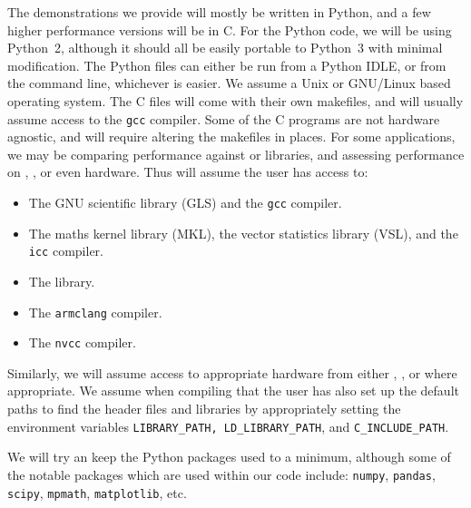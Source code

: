 \documentclass[11pt,a4paper,twoside,english]{extarticle}
\begin{document}
The demonstrations we provide will mostly be written in Python, and a few higher performance versions will be in C. For the Python code, we will be using Python~2, although it should all be easily portable to Python~3 with minimal modification. The Python files can either be run from a Python IDLE, or from the command line, whichever is easier. We assume a Unix or GNU/Linux based operating system. The C files will come with their own makefiles, and will usually assume access to the \texttt{gcc} compiler. Some of the C programs are not hardware agnostic, and will require altering the makefiles in places. For some applications, we may be comparing performance against \intel or \nag libraries, and assessing performance on \intel, \arm, or even \nvidia hardware. Thus will assume the user has access to:
\begin{itemize}
\item The GNU scientific library (GLS) and the \texttt{gcc} compiler.
\item The \intel maths kernel library (MKL), the vector statistics library (VSL), and the \texttt{icc} compiler. 
\item The \nag library. 
\item The \arm \texttt{armclang} compiler.
\item The \nvidia \texttt{nvcc} compiler.
\end{itemize} 
Similarly, we will assume access to appropriate hardware from either \intel, \arm, or \nvidia where appropriate. We assume when compiling that the user has also set up the default paths to find the header files and libraries by appropriately setting the environment variables \verb|LIBRARY_PATH, |\verb|LD_LIBRARY_PATH|, and \verb|C_INCLUDE_PATH|.

We will try an keep the Python packages used to a minimum, although some of the notable packages which are used within our code include: \texttt{numpy}, \texttt{pandas}, \texttt{scipy}, \texttt{mpmath}, \texttt{matplotlib}, etc. 
\end{document}
